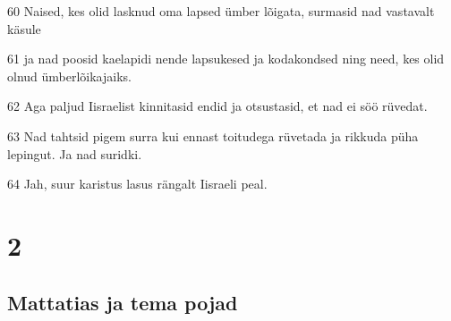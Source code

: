 \par 60 Naised, kes olid lasknud oma lapsed ümber lõigata, surmasid nad vastavalt käsule
\par 61 ja nad poosid kaelapidi nende lapsukesed ja kodakondsed ning need, kes olid olnud ümberlõikajaiks.
\par 62 Aga paljud Iisraelist kinnitasid endid ja otsustasid, et nad ei söö rüvedat.
\par 63 Nad tahtsid pigem surra kui ennast toitudega rüvetada ja rikkuda püha lepingut. Ja nad suridki.
\par 64 Jah, suur karistus lasus rängalt Iisraeli peal.

\chapter{2}

\section*{Mattatias ja tema pojad}

